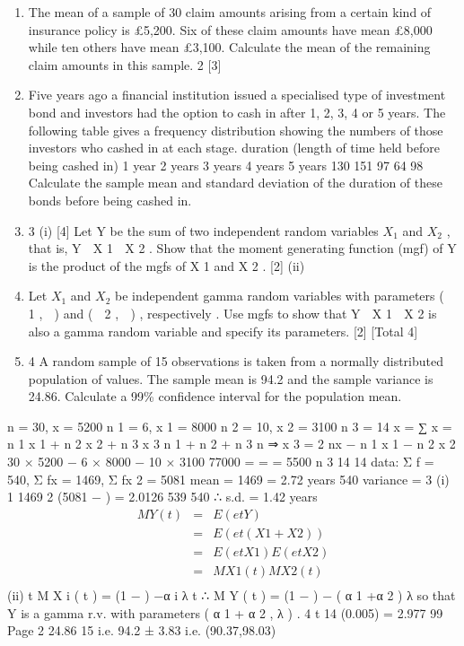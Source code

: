 \documentclass[a4paper,12pt]{article}
\begin{document}
\begin{enumerate} 
\item The mean of a sample of 30 claim amounts arising from a certain kind of insurance
policy is £5,200. Six of these claim amounts have mean £8,000 while ten others have mean £3,100.
Calculate the mean of the remaining claim amounts in this sample.
2
[3]
\item Five years ago a financial institution issued a specialised type of investment bond and investors had the option to cash in after 1, 2, 3, 4 or 5 years. The following table gives a frequency distribution showing the numbers of those investors who cashed in
at each stage.
duration (length of time held before being cashed in)
1 year
2 years
3 years
4 years
5 years
130
151
97
64
98
Calculate the sample mean and standard deviation of the duration of these bonds before being cashed in.

\item 3
(i)
[4]
Let Y be the sum of two independent random variables $X_1$ and $X_2$ , that is,
Y  X 1  X 2 .
Show that the moment generating function (mgf) of Y is the product of the
mgfs of X 1 and X 2 .
[2]
(ii)
\item Let $X_1$ and $X_2$ be independent gamma random variables with parameters
(  1 ,  ) and (  2 ,  ) , respectively .
Use mgfs to show that Y  X 1  X 2 is also a gamma random variable and
specify its parameters.
[2]
[Total 4]

\item 4
A random sample of 15 observations is taken from a normally distributed population
of values. The sample mean is 94.2 and the sample variance is 24.86.
Calculate a 99\% confidence interval for the population mean.
\end{enumerate}

n = 30, x = 5200
n 1 = 6, x 1 = 8000
n 2 = 10, x 2 = 3100
n 3 = 14
x =
∑ x = n 1 x 1 + n 2 x 2 + n 3 x 3
n 1 + n 2 + n 3
n
⇒ x 3 =
2
nx − n 1 x 1 − n 2 x 2 30 × 5200 − 6 × 8000 − 10 × 3100 77000
=
=
= 5500
n 3
14
14
data: Σ f = 540, Σ fx = 1469, Σ fx 2 = 5081
mean =
1469
= 2.72 years
540
variance =
3
(i)
1
1469 2
(5081 −
) = 2.0126
539
540
∴ s.d. = 1.42 years
\begin{eqnarray*}
M Y ( t ) &=& E ( e tY ) \\ &=& E ( e t ( X 1 + X 2 ) )
\\ &=& E ( e tX 1 ) E ( e tX 2 ) \\ &=& M X 1 ( t ) M X 2 ( t )\\
\end{eqnarray*}
(ii)
t
M X i ( t ) = (1 − ) −α i
λ
t
∴ M Y ( t ) = (1 − ) − ( α 1 +α 2 )
λ
so that Y is a gamma r.v. with parameters ( α 1 + α 2 , λ ) .
4
t 14 (0.005) = 2.977
99%
Page 2
24.86
15
i.e. 94.2 ± 3.83 i.e. (90.37,98.03)

\end{document}
